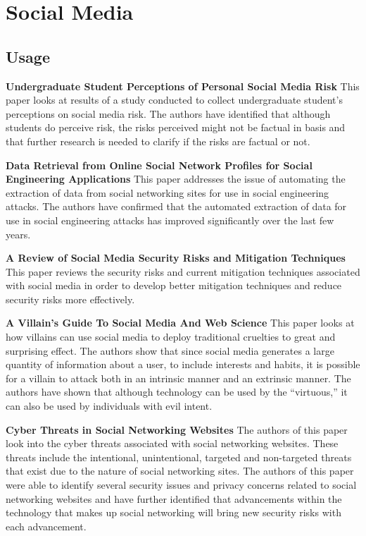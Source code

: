 \documentclass[conference]{IEEEtran}
\begin{document}
\section{Social Media}

\subsection{Usage}

\textbf {Undergraduate Student Perceptions of Personal Social Media Risk}
This paper looks at results of a study conducted to collect undergraduate student’s perceptions on social media risk. The authors have identified that although students do perceive risk, the risks perceived might not be factual in basis and that further research is needed to clarify if the risks are factual or not. 

\textbf {Data Retrieval from Online Social Network Profiles for Social Engineering Applications}
This paper addresses the issue of automating the extraction of data from social networking sites for use in social engineering attacks. The authors have confirmed that the automated extraction of data for use in social engineering attacks has improved significantly over the last few years. 

\textbf {A Review of Social Media Security Risks and Mitigation Techniques}
This paper reviews the security risks and current mitigation techniques associated with social media in order to develop better mitigation techniques and reduce security risks more effectively. 

\textbf {A Villain’s Guide To Social Media And Web Science}
This paper looks at how villains can use social media to deploy traditional cruelties to great and surprising effect. The authors show that since social media generates a large quantity of information about a user, to include interests and habits, it is possible for a villain to attack both in an intrinsic manner and an extrinsic manner. The authors have shown that although technology can be used by the “virtuous,” it can also be used by individuals with evil intent. 

\textbf {Cyber Threats in Social Networking Websites}
The authors of this paper look into the cyber threats associated with social networking websites.  These threats include the intentional, unintentional, targeted and non-targeted threats that exist due to the nature of social networking sites. The authors of this paper were able to identify several security issues and privacy concerns related to social networking websites and have further identified that advancements within the technology that makes up social networking will bring new security risks with each advancement. 
\end{document}
